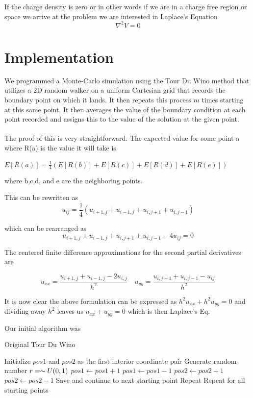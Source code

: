 \documentclass{amsart}
\begin{document}
If the charge density is zero or in other words if we are in a charge free region or space we arrive at the problem we are interested in Laplace's Equation
$$\nabla ^2 V=0$$

\section{Implementation}
We programmed a Monte-Carlo simulation using the Tour Du Wino method that utilizes a 2D random walker on a uniform Cartesian grid that records the boundary point on which it lands. It then repeats this process $m$ times starting at this same point. It then averages the value of the boundary condition at each point recorded and assigns this to the value of the solution at the given point.\cite{farlow2012partial}\\
\vspace{0.1cm}\\
The proof of this is very straightforward. The expected value for some point a where R(a) is the value it will take is

$ E[R(a)] = \frac{1}{4} (E[R(b)] + E[R(c)] + E[R(d)] + E[R(e)]  )$

where b,c,d, and e are the neighboring points.

This can be rewritten as
\begin{equation}
u_{ij} = \frac{1}{4} (u_{i+1,j} + u_{i-1,j} + u_{i,j+1} + u_{i,j-1})
\end{equation}

which can be rearranged as
\begin{equation*}
u_{i+1,j} + u_{i-1,j} + u_{i,j+1} + u_{i,j-1} - 4u_{ij} = 0
\end{equation*}

The centered finite difference approximations for the second partial derivatives are

\begin{equation*} 
	u_{xx} = \frac{u_{i+1,j} + u_{i-1,j} - 2u_{i,j}}{h^2} \quad u_{yy} = \frac{u_{i,j+1} + u_{i,j-1} - u_{ij}}{h^2}
\end{equation*}

It is now clear the above formulation can be expressed as $h^2 u_{xx} + h^2 u_{yy} = 0$ and dividing away $h^2$ leaves us $u_{xx} + u_{yy} = 0$ which is then Laplace's Eq.

Our initial algorithm was
\begin{algorithm}
	\caption{Original Tour Du Wino}
	\label{oldalgo}
	\begin{algorithmic}[1]
		\State Initialize $pos1$ and $pos2$ as the first interior coordinate pair
		\State Generate random number $r = \thicksim U(0,1)$
			\State $pos1 \gets pos1 + 1$
			\State $pos1 \gets pos1 - 1$
			\State $pos2 \gets pos2 + 1$
		\Else
			\State $pos2 \gets pos2 - 1$
		\EndIf
			\State Save and continue to next starting point
		\Else
			\State Repeat
		\EndIf
		\State Repeat for all starting points
	\end{algorithmic}
\end{algorithm}
\end{document}
